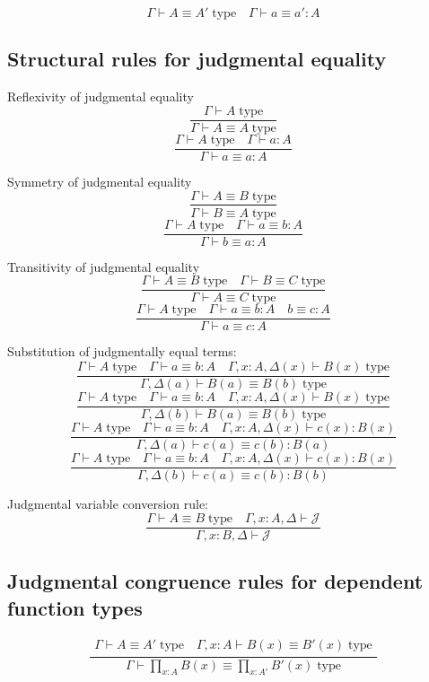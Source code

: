 \documentclass{book}
\begin{document}
$$\Gamma \vdash A \equiv A' \; \mathrm{type} \quad \Gamma \vdash a \equiv a':A$$

\subsection{Structural rules for judgmental equality}

Reflexivity of judgmental equality
$$\frac{\Gamma \vdash A \; \mathrm{type}}{\Gamma \vdash A \equiv A \; \mathrm{type}}$$
$$\frac{\Gamma \vdash A \; \mathrm{type} \quad \Gamma \vdash a:A}{\Gamma \vdash a \equiv a:A}$$

Symmetry of judgmental equality
$$\frac{\Gamma \vdash A \equiv B \; \mathrm{type}}{\Gamma \vdash B \equiv A \; \mathrm{type}}$$ 
$$\frac{\Gamma \vdash A \; \mathrm{type} \quad \Gamma \vdash a \equiv b:A}{\Gamma \vdash b \equiv a:A}$$

Transitivity of judgmental equality
$$\frac{\Gamma \vdash A \equiv B \; \mathrm{type} \quad \Gamma \vdash B \equiv C \; \mathrm{type} }{\Gamma \vdash A \equiv C \; \mathrm{type}}$$
$$\frac{\Gamma \vdash A \; \mathrm{type} \quad \Gamma \vdash a \equiv b:A \quad b \equiv c:A }{\Gamma \vdash a \equiv c:A}$$

Substitution of judgmentally equal terms:
$$\frac{\Gamma \vdash A \; \mathrm{type} \quad \Gamma \vdash a \equiv b : A \quad \Gamma, x:A, \Delta(x) \vdash B(x) \; \mathrm{type}}{\Gamma, \Delta(a) \vdash B(a) \equiv B(b) \; \mathrm{type}}$$
$$\frac{\Gamma \vdash A \; \mathrm{type} \quad \Gamma \vdash a \equiv b : A \quad \Gamma, x:A, \Delta(x) \vdash B(x) \; \mathrm{type}}{\Gamma, \Delta(b) \vdash B(a) \equiv B(b) \; \mathrm{type}}$$
$$\frac{\Gamma \vdash A \; \mathrm{type} \quad \Gamma \vdash a \equiv b : A \quad \Gamma, x:A, \Delta(x) \vdash c(x):B(x)}{\Gamma, \Delta(a) \vdash c(a) \equiv c(b): B(a)}$$
$$\frac{\Gamma \vdash A \; \mathrm{type} \quad \Gamma \vdash a \equiv b : A \quad \Gamma, x:A, \Delta(x) \vdash c(x):B(x)}{\Gamma, \Delta(b) \vdash c(a) \equiv c(b): B(b)}$$

Judgmental variable conversion rule:
$$\frac{\Gamma \vdash A \equiv B \; \mathrm{type} \quad \Gamma, x:A, \Delta \vdash \mathcal{J}}{\Gamma, x:B, \Delta \vdash \mathcal{J}}$$

\subsection{Judgmental congruence rules for dependent function types}
$$\frac{
\begin{array}{c}
	\Gamma \vdash A \equiv A' \; \mathrm{type} \quad \Gamma, x:A \vdash B(x) \equiv B'(x) \; \mathrm{type}
\end{array}
}{\Gamma \vdash \prod_{x:A} B(x) \equiv \prod_{x:A'} B'(x)\; \mathrm{type}}$$
\end{document}
